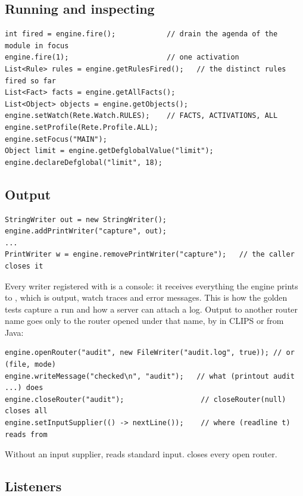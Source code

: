 \subsection{Running and inspecting}

\begin{lstlisting}[style=java]
int fired = engine.fire();            // drain the agenda of the module in focus
engine.fire(1);                       // one activation
List<Rule> rules = engine.getRulesFired();   // the distinct rules fired so far
List<Fact> facts = engine.getAllFacts();
List<Object> objects = engine.getObjects();
engine.setWatch(Rete.Watch.RULES);    // FACTS, ACTIVATIONS, ALL
engine.setProfile(Rete.Profile.ALL);
engine.setFocus("MAIN");
Object limit = engine.getDefglobalValue("limit");
engine.declareDefglobal("limit", 18);
\end{lstlisting}

\subsection{Output}

\begin{lstlisting}[style=java]
StringWriter out = new StringWriter();
engine.addPrintWriter("capture", out);
...
PrintWriter w = engine.removePrintWriter("capture");   // the caller closes it
\end{lstlisting}

Every writer registered with  is a console: it
receives everything the engine prints to , which is  output, watch traces and error messages. This is how the golden tests
capture a run and how a server can attach a log. Output to another router
name goes only to the router opened under that name, by  in
CLIPS or from Java:

\begin{lstlisting}[style=java]
engine.openRouter("audit", new FileWriter("audit.log", true)); // or (file, mode)
engine.writeMessage("checked\n", "audit");   // what (printout audit ...) does
engine.closeRouter("audit");                  // closeRouter(null) closes all
engine.setInputSupplier(() -> nextLine());    // where (readline t) reads from
\end{lstlisting}

Without an input supplier,  reads standard input.
 closes every open router.

\subsection{Listeners}

